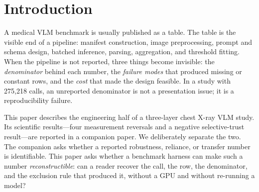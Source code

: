 \section{Introduction}
\label{sec:intro}

A medical VLM benchmark is usually published as a table. The table is the visible end of a pipeline: manifest construction, image preprocessing, prompt and schema design, batched inference, parsing, aggregation, and threshold fitting. When the pipeline is not reported, three things become invisible: the \emph{denominator} behind each number, the \emph{failure modes} that produced missing or constant rows, and the \emph{cost} that made the design feasible. In a study with 275,218 calls, an unreported denominator is not a presentation issue; it is a reproducibility failure.

This paper describes the engineering half of a three-layer chest X-ray VLM study. Its scientific results---four measurement reversals and a negative selective-trust result---are reported in a companion paper. We deliberately separate the two. The companion asks whether a reported robustness, reliance, or transfer number is identifiable. This paper asks whether a benchmark harness can make such a number \emph{reconstructible}: can a reader recover the call, the row, the denominator, and the exclusion rule that produced it, without a GPU and without re-running a model?

